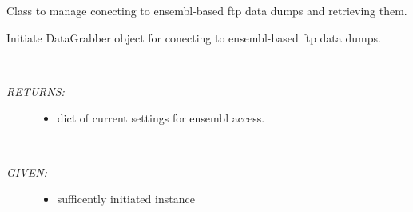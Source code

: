 \documentclass[letterpaper,10pt,english]{sphinxmanual}
\begin{document}
\begin{fulllineitems}
\label{code:gfunc.ensembl_data.DataGrabber}
Class to manage conecting to ensembl-based ftp data dumps and retrieving them.

\begin{fulllineitems}
\label{code:gfunc.ensembl_data.DataGrabber.__init__}
Initiate DataGrabber object for conecting to ensembl-based ftp data dumps.

\end{fulllineitems}


\begin{fulllineitems}
\label{code:gfunc.ensembl_data.DataGrabber.settings}~\begin{description}
\item[{\emph{RETURNS:}}] \leavevmode\begin{itemize}
\item {} 
dict of current settings for ensembl access.

\end{itemize}

\end{description}

\end{fulllineitems}


\begin{fulllineitems}
\label{code:gfunc.ensembl_data.DataGrabber.transfer_data}~\begin{description}
\item[{\emph{GIVEN:}}] \leavevmode\begin{itemize}
\item {} 
sufficently initiated  instance

\end{itemize}


\end{description}
\end{fulllineitems}
\end{fulllineitems}
\end{document}
